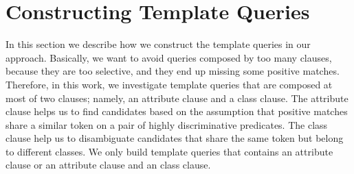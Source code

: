 \section{Constructing Template Queries}


In this section we describe how we construct the template queries in our approach. Basically, we want to avoid queries composed by too many clauses, because they are too selective, and they end up missing some positive matches. Therefore, in this work, we investigate template queries that are composed at most of two clauses; namely, an attribute clause and a class clause. The attribute clause helps us to find candidates based on the assumption that positive matches share a similar token on a pair of highly discriminative predicates. The class clause help us to disambiguate candidates that share the same token but belong to different classes.  We only build template queries that contains an attribute clause or an attribute clause and an class clause. 

